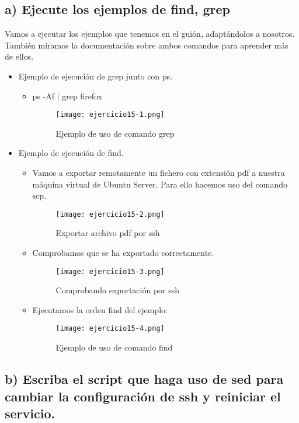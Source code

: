 	\subsection{a) Ejecute los ejemplos de find, grep}
	
	Vamos a ejecutar los ejemplos que tenemos en el guión, adaptándolos a nosotros. También miramos la documentación sobre ambos comandos para aprender más de ellos.
	
	\begin{itemize}
		\item Ejemplo de ejecución de grep\cite{ejercicio15-1} junto con ps\cite{ejercicio15-2}.
			\begin{itemize}
				\item ps -Af | grep firefox
				\begin{figure}[H]	
					\centering
					\texttt{[image: ejercicio15-1.png]} 
					\label{figura102} 
					\caption{Ejemplo de uso de comando grep}
				\end{figure}
			\end{itemize}
		\item Ejemplo de ejecución de find.
			\begin{itemize}
				\item Vamos a exportar remotamente un fichero con extensión pdf a nuestra máquina virtual de Ubuntu Server. Para ello hacemos uso del comando scp\cite{ejercicio15-3}.
					\begin{figure}[H]	
						\centering
						\texttt{[image: ejercicio15-2.png]} 
						\label{figura103} 
						\caption{Exportar archivo pdf por ssh}
					\end{figure}
				\item Comprobamos que se ha exportado correctamente.
					\begin{figure}[H]	
						\centering
						\texttt{[image: ejercicio15-3.png]} 
						\label{figura104} 
						\caption{Comprobando exportación por ssh}
					\end{figure}
				\item Ejecutamos la orden find del ejemplo:
				\begin{figure}[H]	
					\centering
					\texttt{[image: ejercicio15-4.png]} 
					\label{figura105} 
					\caption{Ejemplo de uso de comando find}
				\end{figure}
			\end{itemize}
	\end{itemize}
	
	\subsection{b) Escriba el script que haga uso de sed para cambiar la configuración de ssh y reiniciar el servicio.}
	
